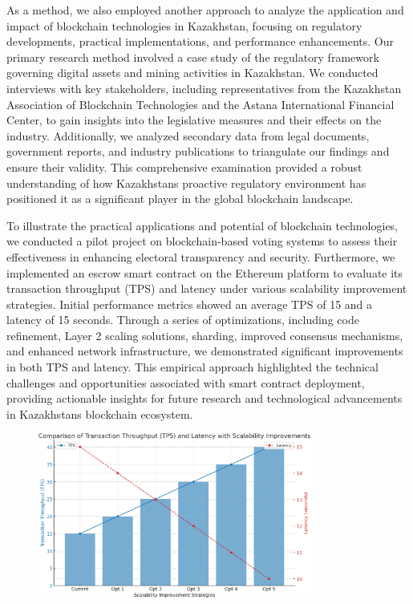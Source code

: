 As a method, we also employed another approach to analyze the
application and impact of blockchain technologies in Kazakhstan,
focusing on regulatory developments, practical implementations, and
performance enhancements. Our primary research method involved a case
study of the regulatory framework governing digital assets and mining
activities in Kazakhstan. We conducted interviews with key stakeholders,
including representatives from the Kazakhstan Association of Blockchain
Technologies and the Astana International Financial Center, to gain
insights into the legislative measures and their effects on the
industry. Additionally, we analyzed secondary data from legal documents,
government reports, and industry publications to triangulate our
findings and ensure their validity. This comprehensive examination
provided a robust understanding of how Kazakhstan\textquotesingle s
proactive regulatory environment has positioned it as a significant
player in the global blockchain landscape.

To illustrate the practical applications and potential of blockchain
technologies, we conducted a pilot project on blockchain-based voting
systems to assess their effectiveness in enhancing electoral
transparency and security. Furthermore, we implemented an escrow smart
contract on the Ethereum platform to evaluate its transaction throughput
(TPS) and latency under various scalability improvement strategies.
Initial performance metrics showed an average TPS of 15 and a latency of
15 seconds. Through a series of optimizations, including code
refinement, Layer 2 scaling solutions, sharding, improved consensus
mechanisms, and enhanced network infrastructure, we demonstrated
significant improvements in both TPS and latency. This empirical
approach highlighted the technical challenges and opportunities
associated with smart contract deployment, providing actionable insights
for future research and technological advancements in
Kazakhstan\textquotesingle s blockchain ecosystem.

\begin{figure}[H]
	\centering
	\includegraphics[width=0.8\textwidth]{assets/81}
	\caption*{}
\end{figure}

